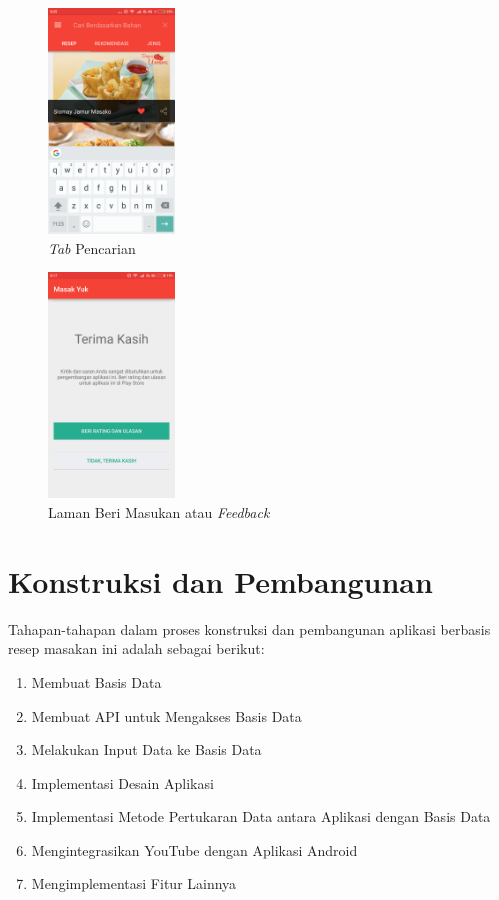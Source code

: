 		\begin{figure}[H]
			\centering
			\includegraphics[width=0.3\textwidth]{gambar/mock-up/cari_bahan}
			\caption{\textit{Tab} Pencarian}
		\end{figure}								
		\begin{figure}[H]
			\centering
			\includegraphics[width=0.3\textwidth]{gambar/mock-up/masukan}
			\caption{Laman Beri Masukan atau \textit{Feedback}}
			\label{mock-feedback}
		\end{figure}
				
\section{Konstruksi dan Pembangunan}
	Tahapan-tahapan dalam proses konstruksi dan pembangunan aplikasi berbasis resep masakan ini adalah sebagai berikut:
	\begin{enumerate}
		\item Membuat Basis Data
		\item Membuat API untuk Mengakses Basis Data
		\item Melakukan Input Data ke Basis Data
		\item Implementasi Desain Aplikasi
		\item Implementasi Metode Pertukaran Data antara Aplikasi dengan Basis Data
		\item Mengintegrasikan YouTube dengan Aplikasi Android
		\item Mengimplementasi Fitur Lainnya 
	\end{enumerate}

